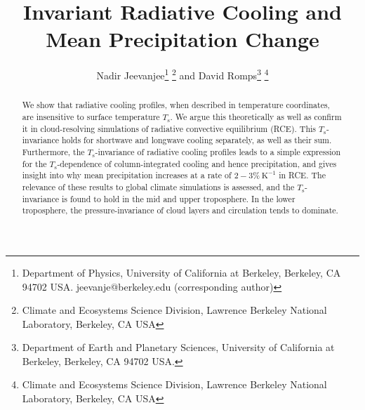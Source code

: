 \documentclass[10pt]{article}
\newcommand{\Ts}{\ensuremath{T_\mathrm{s}}}
\newcommand{\Kinverse}{\ensuremath{\mathrm{K^{-1}}}}
\begin{document}
%
%


\title{Invariant Radiative Cooling and Mean Precipitation Change}

%
%


 \author{Nadir Jeevanjee\footnote{Department of Physics, University of California at Berkeley, Berkeley, CA 94702  USA. jeevanje@berkeley.edu (corresponding author)} \footnote{Climate and Ecosystems Science Division, Lawrence Berkeley National Laboratory, Berkeley, CA USA} and David Romps\footnote{Department of Earth and Planetary Sciences, University of California at Berkeley, Berkeley, CA 94702  USA.} \footnote{Climate and Ecosystems Science Division, Lawrence Berkeley National Laboratory, Berkeley, CA USA}
}

\maketitle

\begin{abstract}
We show that radiative cooling profiles, when described in temperature coordinates, are insensitive to surface temperature \Ts. We argue this theoretically as well as confirm it in cloud-resolving simulations of radiative convective equilibrium (RCE). This \Ts-invariance holds for shortwave and longwave cooling separately, as well as their sum. Furthermore, the \Ts-invariance of radiative cooling profiles leads to a simple expression for the \Ts-dependence of column-integrated cooling and hence precipitation, and gives insight into why mean precipitation increases at a rate of $2 -3\%\ \Kinverse$ in RCE.  The relevance of these results to global climate simulations is assessed, and the \Ts-invariance is found to hold in the mid and upper troposphere.  In the lower troposphere, the pressure-invariance of cloud layers and circulation tends to dominate.
%
%
\end{abstract}


%
%
\end{document}
